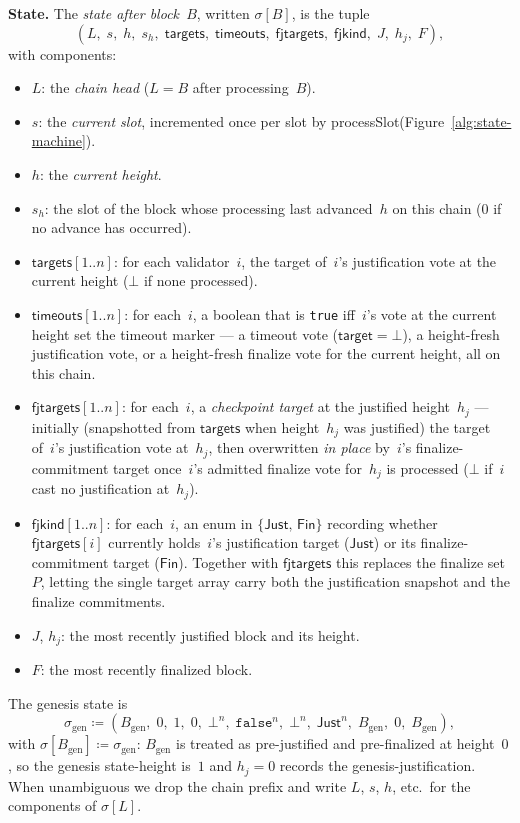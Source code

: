 \ifx\litemode\undefined\documentclass{article}\fi
\newcommand{\genesis}{\ensuremath{B_{\mathrm{gen}}}}
\newcommand{\target}{\mathsf{target}}
\newcommand{\targets}{\mathsf{targets}}
\newcommand{\timeouts}{\mathsf{timeouts}}
\newcommand{\fjtargets}{\mathsf{fjtargets}}
\newcommand{\fjkind}{\mathsf{fjkind}}
\newcommand{\kjust}{\mathsf{Just}}
\newcommand{\kfin}{\mathsf{Fin}}
\newcommand{\processSlot}{\textsf{processSlot}\xspace}
\renewcommand{\paragraph}[1]{\vspace{7pt}\noindent\textbf{#1}}
\theoremstyle{plain}
\theoremstyle{definition}
\theoremstyle{remark}
\begin{document}
\paragraph{State.}
The \emph{state after block~$B$}, written $\sigma[B]$, is the tuple
\[
  (L,\; s,\; h,\; s_h,\; \targets,\; \timeouts,\; \fjtargets,\; \fjkind,\; J,\; h_j,\; F),
\]
with components:
\begin{itemize}
  \item $L$: the \emph{chain head} ($L = B$ after processing~$B$).
  \item $s$: the \emph{current slot}, incremented once per slot by \processSlot (Figure~\ref{alg:state-machine}).
  \item $h$: the \emph{current height}.
  \item $s_h$: the slot of the block whose processing last advanced~$h$ on this chain ($0$ if no advance has occurred).
  \item $\targets[1..n]$: for each validator~$i$, the target of~$i$'s justification vote at the current height ($\bot$ if none processed).
  \item $\timeouts[1..n]$: for each~$i$, a boolean that is \texttt{true} iff~$i$'s vote at the current height set the timeout marker --- a timeout vote ($\target = \bot$), a height-fresh justification vote, or a height-fresh finalize vote for the current height, all on this chain.
  \item $\fjtargets[1..n]$: for each~$i$, a \emph{checkpoint target} at the justified height~$h_j$ --- initially (snapshotted from $\targets$ when height~$h_j$ was justified) the target of~$i$'s justification vote at~$h_j$, then overwritten \emph{in place} by~$i$'s finalize-commitment target once~$i$'s admitted finalize vote for~$h_j$ is processed ($\bot$ if~$i$ cast no justification at~$h_j$).
  \item $\fjkind[1..n]$: for each~$i$, an enum in $\{\kjust,\, \kfin\}$ recording whether $\fjtargets[i]$ currently holds~$i$'s justification target ($\kjust$) or its finalize-commitment target ($\kfin$). Together with $\fjtargets$ this replaces the finalize set~$P$, letting the single target array carry both the justification snapshot and the finalize commitments.
  \item $J$, $h_j$: the most recently justified block and its height.
  \item $F$: the most recently finalized block.
\end{itemize}
The genesis state is
\[
  \sigma_{\mathrm{gen}} \coloneqq (\genesis,\; 0,\; 1,\; 0,\; \bot^n,\; \mathtt{false}^n,\; \bot^n,\; \kjust^n,\; \genesis,\; 0,\; \genesis),
\]
with $\sigma[\genesis] \coloneqq \sigma_{\mathrm{gen}}$: $\genesis$ is treated as pre-justified and pre-finalized at height~$0$, so the genesis state-height is~$1$ and $h_j = 0$ records the genesis-justification.
When unambiguous we drop the chain prefix and write $L$, $s$, $h$, etc.\ for the components of $\sigma[L]$.
\end{document}

